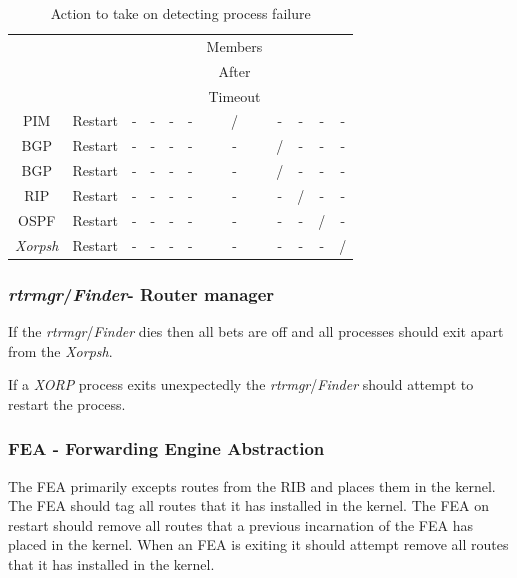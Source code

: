 \documentclass[11pt]{article}
\makeatletter
\newcommand{\xorp} {{\em XORP}\@\xspace}
\newcommand{\finder} {{\em Finder}\@\xspace}
\newcommand{\xorpsh} {{\em Xorpsh}\@\xspace}
\newcommand{\rtrmgr} {{\em rtrmgr}\@\xspace}
\makeatother
\begin{document}
\begin{table}[ht]
\begin{center}
\begin{tabular}{|c|c|c|c|c|c|c|c|c|c|c|}
                &                 &          &      &      &      & Members &      &      &      &         \\
                &                 &          &      &      &      & After   &      &      &      &         \\
                &                 &          &      &      &      & Timeout &      &      &      &         \\\hline
PIM             &  Restart        & -        & -    & -    & -    & /       & -    & -    & -    & -       \\\hline
BGP             &  Restart        & -        & -    & -    & -    & -       & /    & -    & -    & -       \\\hline
BGP             &  Restart        & -        & -    & -    & -    & -       & /    & -    & -    & -       \\\hline
RIP             &  Restart        & -        & -    & -    & -    & -       & -    & /    & -    & -       \\\hline
OSPF            &  Restart        & -        & -    & -    & -    & -       & -    & -    & /    & -       \\\hline
\xorpsh         &  Restart        & -        & -    & -    & -    & -       & -    & -    & -    & /       \\\hline
\end{tabular}
\end{center}
\caption{\label{failure_table}Action to take on detecting process failure}
\end{table}

\subsubsection{\rtrmgr/\finder - Router manager}

If the \rtrmgr/\finder dies then all bets are off and all processes
should exit apart from the \xorpsh.

If a \xorp process exits unexpectedly the \rtrmgr/\finder should
attempt to restart the process.

\subsubsection{FEA - Forwarding Engine Abstraction}

The FEA primarily excepts routes from the RIB and places them in the
kernel. The FEA should tag all routes that it has installed in the
kernel. The FEA on restart should remove all routes that a previous
incarnation of the FEA has placed in the kernel. When an FEA is
exiting it should attempt remove all routes that it has installed in
the kernel.
\end{document}
